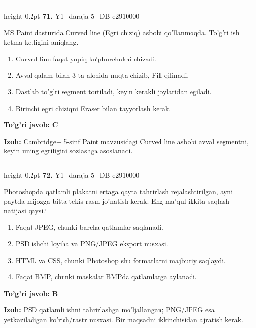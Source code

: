 \documentclass[10pt,a4paper,oneside]{article}
\begin{document}
\vspace{2mm}\hrule height 0.2pt \vspace{4mm}
\hypertarget{q71}{\textbf{\color{ink}71.}}  {\color{muted}\scriptsize Y1 \textbullet\ daraja 5 \textbullet\ DB e2910000}
\par
MS Paint dasturida Curved line (Egri chiziq) asbobi qo'llanmoqda. To'g'ri ish ketma-ketligini aniqlang.
\begin{enumerate}[label=\Alph*),leftmargin=9mm]
\item Curved line faqat yopiq ko'pburchakni chizadi.
\item Avval qalam bilan 3 ta alohida nuqta chizib, Fill qilinadi.
\item Dastlab to'g'ri segment tortiladi, keyin kerakli joylaridan egiladi.
\item Birinchi egri chiziqni Eraser bilan tayyorlash kerak.
\end{enumerate}
\begin{tcolorbox}[enhanced,breakable,colback=teal!4,colframe=teal!45!black,boxrule=0.45pt,arc=1.2mm,left=2.8mm,right=2.8mm,top=2mm,bottom=2mm,before skip=2mm,after skip=2mm]
\textbf{\color{teal}To'g'ri javob:} \textbf{C}
\par\smallskip
\textbf{Izoh:} Cambridge+ 5-sinf Paint mavzusidagi Curved line asbobi avval segmentni, keyin uning egriligini sozlashga asoslanadi.
\end{tcolorbox}
\vspace{2mm}\hrule height 0.2pt \vspace{4mm}
\hypertarget{q72}{\textbf{\color{ink}72.}}  {\color{muted}\scriptsize Y1 \textbullet\ daraja 5 \textbullet\ DB e2910000}
\par
Photoshopda qatlamli plakatni ertaga qayta tahrirlash rejalashtirilgan, ayni paytda mijozga bitta tekis rasm jo'natish kerak. Eng ma'qul ikkita saqlash natijasi qaysi?
\begin{enumerate}[label=\Alph*),leftmargin=9mm]
\item Faqat JPEG, chunki barcha qatlamlar saqlanadi.
\item PSD ishchi loyiha va PNG/JPEG eksport nusxasi.
\item HTML va CSS, chunki Photoshop shu formatlarni majburiy saqlaydi.
\item Faqat BMP, chunki maskalar BMPda qatlamlarga aylanadi.
\end{enumerate}
\begin{tcolorbox}[enhanced,breakable,colback=teal!4,colframe=teal!45!black,boxrule=0.45pt,arc=1.2mm,left=2.8mm,right=2.8mm,top=2mm,bottom=2mm,before skip=2mm,after skip=2mm]
\textbf{\color{teal}To'g'ri javob:} \textbf{B}
\par\smallskip
\textbf{Izoh:} PSD qatlamli ishni tahrirlashga mo'ljallangan; PNG/JPEG esa yetkaziladigan ko'rish/rastr nusxasi. Bir maqsadni ikkinchisidan ajratish kerak.
\end{tcolorbox}
\end{document}

